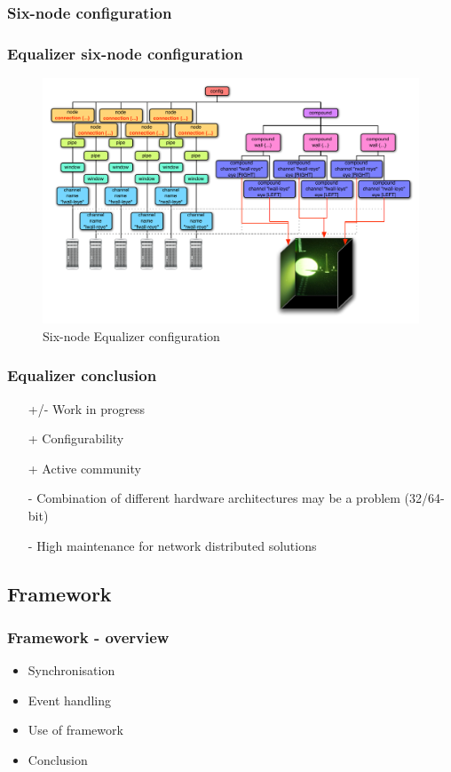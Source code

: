 \subsubsection*{Six-node configuration}
\begin{frame}\frametitle{Equalizer six-node configuration}
	\begin{figure}
		\centering
		\includegraphics[width=\textwidth]{../figures/6nodeConfig}
		\caption{Six-node Equalizer configuration}
	\end{figure}
\end{frame}

\begin{frame}\frametitle{Equalizer conclusion}
	\begin{itemize}
		\item [+/-] Work in progress
		\item [+] Configurability
		\item [+] Active community
		\item [-] Combination of different hardware architectures may be a problem (32/64-bit)
		\item [-] High maintenance for network distributed solutions
	\end{itemize}
\end{frame}

\subsection{Framework}
\begin{frame}\frametitle{Framework - overview}
	\begin{itemize}
		\item<1-> Synchronisation
		\item<2-> Event handling
		\item<3-> Use of framework
		\item<4-> Conclusion
	\end{itemize}
\end{frame}

